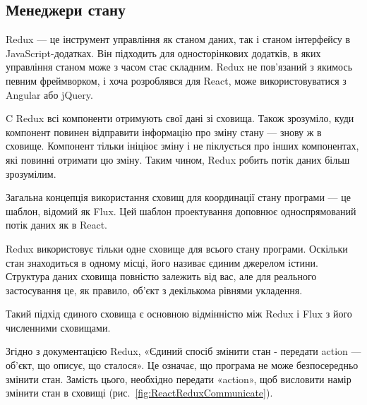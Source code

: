 \subsection{Менеджери стану}

Redux — це інструмент управління як станом даних, так і станом інтерфейсу в JavaScript-додатках. Він підходить для односторінкових додатків, в яких управління станом може з часом стає складним. Redux не пов'язаний з якимось певним фреймворком, і хоча розроблявся для React, може використовуватися з Angular або jQuery.

C Redux всі компоненти отримують свої дані зі сховища. Також зрозуміло, куди компонент повинен відправити інформацію про зміну стану — знову ж в сховище. Компонент тільки ініціює зміну і не піклується про інших компонентах, які повинні отримати цю зміну. Таким чином, Redux робить потік даних більш зрозумілим.

Загальна концепція використання сховищ для координації стану програми — це шаблон, відомий як Flux. Цей шаблон проектування доповнює односпрямований потік даних як в React.

Redux використовує тільки одне сховище для всього стану програми. Оскільки стан знаходиться в одному місці, його називає єдиним джерелом істини. Структура даних сховища повністю залежить від вас, але для реального застосування це, як правило, об'єкт з декількома рівнями укладення.

Такий підхід єдиного сховища є основною відмінністю між Redux і Flux з його численними сховищами.

Згідно з документацією Redux, «Єдиний спосіб змінити стан - передати action — об'єкт, що описує, що сталося». Це означає, що програма не може безпосередньо змінити стан. Замість цього, необхідно передати «action», щоб висловити намір змінити стан в сховищі (рис.~\ref{fig:ReactReduxCommunicate}).
